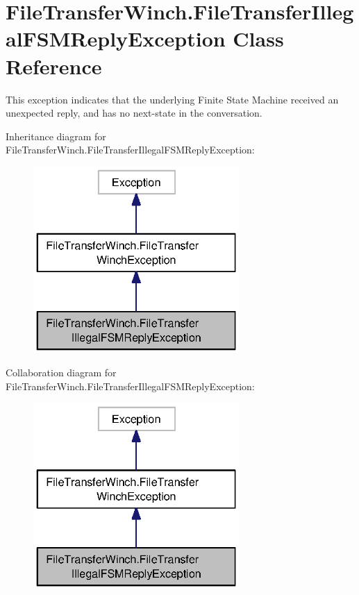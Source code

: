 \section{File\-Transfer\-Winch.\-File\-Transfer\-Illegal\-F\-S\-M\-Reply\-Exception Class Reference}
\label{classorg_1_1smallfoot_1_1filexfer_1_1FileTransferWinch_1_1FileTransferIllegalFSMReplyException}


This exception indicates that the underlying Finite State Machine received an unexpected reply, and has no next-\/state in the conversation.  




Inheritance diagram for File\-Transfer\-Winch.\-File\-Transfer\-Illegal\-F\-S\-M\-Reply\-Exception\-:\nopagebreak
\begin{figure}[H]
\begin{center}
\leavevmode
\includegraphics[width=222pt]{classorg_1_1smallfoot_1_1filexfer_1_1FileTransferWinch_1_1FileTransferIllegalFSMReplyException__inherit__graph}
\end{center}
\end{figure}


Collaboration diagram for File\-Transfer\-Winch.\-File\-Transfer\-Illegal\-F\-S\-M\-Reply\-Exception\-:\nopagebreak
\begin{figure}[H]
\begin{center}
\leavevmode
\includegraphics[width=222pt]{classorg_1_1smallfoot_1_1filexfer_1_1FileTransferWinch_1_1FileTransferIllegalFSMReplyException__coll__graph}
\end{center}
\end{figure}
